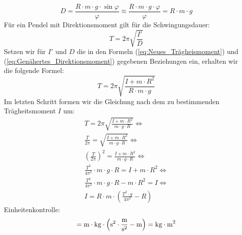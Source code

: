 \documentclass{article}
\begin{document}
	\begin{equation}\label{eq:Genähertes_Direktionsmoment}
		D = \frac{ R \cdot m \cdot g \cdot \sin \varphi }{ \varphi } \approx \frac{ R \cdot m \cdot g \cdot \varphi }{ \varphi } = R \cdot m \cdot g
	\end{equation}
	Für ein Pendel mit Direktionsmoment gilt für die Schwingungsdauer:
	\begin{equation}
		T = 2 \pi \sqrt{ \frac{I'}{D} }
	\end{equation}
	Setzen wir für \(I'\) und \(D\) die in den Formeln (\ref{eq:Neues_Trägheismoment}) und (\ref{eq:Genähertes_Direktionsmoment}) gegebenen Beziehungen ein, erhalten wir die folgende Formel:
	\begin{equation}
		T = 2 \pi \sqrt{ \frac{ I + m \cdot R^2 }{ R \cdot m \cdot g } }
	\end{equation}
	Im letzten Schritt formen wir die Gleichung nach dem zu bestimmenden Trägheitsmoment \(I\) um:
	\begin{equation}
		\begin{gathered} \label{eq:Trägheitsmoment_Schwingung}
			T = 2 \pi \sqrt{ \frac{ I + m \cdot R^2 }{ m \cdot g \cdot R } } \Leftrightarrow \\
			\frac{T}{ 2 \pi } = \sqrt{ \frac{ I + m \cdot R^2 }{ m \cdot g \cdot R } } \Leftrightarrow \\
			{\left( \frac{T}{ 2 \pi } \right)}^2 = \frac{ I + m \cdot R^2 }{ m \cdot g \cdot R } \Leftrightarrow \\
			\frac{T^2}{4 \pi^2} \cdot m \cdot g \cdot R = I + m \cdot R^2 \Leftrightarrow \\
			\frac{T^2}{4 \pi^2} \cdot m \cdot g \cdot R - m \cdot R^2 = I \Leftrightarrow \\
			I = R \cdot m \cdot \left( \frac{T^2 \cdot g }{ 4 \pi^2 } - R \right)
		\end{gathered}
	\end{equation}
	Einheitenkontrolle:
	\begin{equation}
		[I] = \unit{\metre} \cdot \unit{\kilogram} \cdot \left( \unit{\second^2} \cdot \unit{\frac{\metre}{\second^2}} - \unit{\metre} \right) = \unit{\kilogram \cdot \metre^2}
	\end{equation}
\end{document}
